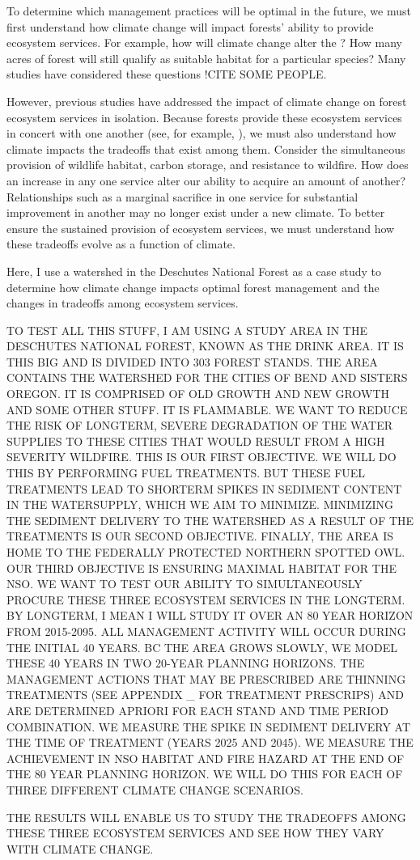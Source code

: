 To determine which management practices will be optimal in the future, we must first understand how climate change will impact forests' ability to provide ecosystem services. For example, how will climate change alter the ? How many acres of forest will still qualify as suitable habitat for a particular species? Many studies have considered these questions !CITE SOME PEOPLE.

However, previous studies have addressed the impact of climate change on forest ecosystem services in isolation. Because forests provide these ecosystem services in concert with one another (see, for example, \cite{toth2009finding}), we must also understand how climate impacts the tradeoffs that exist among them. Consider the simultaneous provision of wildlife habitat, carbon storage, and resistance to wildfire. How does an increase in any one service alter our ability to acquire an amount of another? Relationships such as a marginal sacrifice in one service for substantial improvement in another may no longer exist under a new climate. To better ensure the sustained provision of ecosystem services, we must understand how these tradeoffs evolve as a function of climate.

Here, I use a watershed in the Deschutes National Forest as a case study to determine how climate change impacts optimal forest management and the changes in tradeoffs among ecosystem services.

TO TEST ALL THIS STUFF, I AM USING A STUDY AREA IN THE DESCHUTES NATIONAL FOREST, KNOWN AS THE DRINK AREA. IT IS THIS BIG AND IS DIVIDED INTO 303 FOREST STANDS. THE AREA CONTAINS THE WATERSHED FOR THE CITIES OF BEND AND SISTERS OREGON. IT IS COMPRISED OF OLD GROWTH AND NEW GROWTH AND SOME OTHER STUFF. IT IS FLAMMABLE. WE WANT TO REDUCE THE RISK OF LONGTERM, SEVERE DEGRADATION OF THE WATER SUPPLIES TO THESE CITIES THAT WOULD RESULT FROM A HIGH SEVERITY WILDFIRE. THIS IS OUR FIRST OBJECTIVE. WE WILL DO THIS BY PERFORMING FUEL TREATMENTS. BUT THESE FUEL TREATMENTS LEAD TO SHORTERM SPIKES IN SEDIMENT CONTENT IN THE WATERSUPPLY, WHICH WE AIM TO MINIMIZE. MINIMIZING THE SEDIMENT DELIVERY TO THE WATERSHED AS A RESULT OF THE TREATMENTS IS OUR SECOND OBJECTIVE. FINALLY, THE AREA IS HOME TO THE FEDERALLY PROTECTED NORTHERN SPOTTED OWL. OUR THIRD OBJECTIVE IS ENSURING MAXIMAL HABITAT FOR THE NSO. WE WANT TO TEST OUR ABILITY TO SIMULTANEOUSLY PROCURE THESE THREE ECOSYSTEM SERVICES IN THE LONGTERM. BY LONGTERM, I MEAN I WILL STUDY IT OVER AN 80 YEAR HORIZON FROM 2015-2095. ALL MANAGEMENT ACTIVITY WILL OCCUR DURING THE INITIAL 40 YEARS. BC THE AREA GROWS SLOWLY, WE MODEL THESE 40 YEARS IN TWO 20-YEAR PLANNING HORIZONS. THE MANAGEMENT ACTIONS THAT MAY BE PRESCRIBED ARE THINNING TREATMENTS (SEE APPENDIX \_ FOR TREATMENT PRESCRIPS) AND ARE DETERMINED APRIORI FOR EACH STAND AND TIME PERIOD COMBINATION. WE MEASURE THE SPIKE IN SEDIMENT DELIVERY AT THE TIME OF TREATMENT (YEARS 2025 AND 2045). WE MEASURE THE ACHIEVEMENT IN NSO HABITAT AND FIRE HAZARD AT THE END OF THE 80 YEAR PLANNING HORIZON. WE WILL DO THIS FOR EACH OF THREE DIFFERENT CLIMATE CHANGE SCENARIOS.

THE RESULTS WILL ENABLE US TO STUDY THE TRADEOFFS AMONG THESE THREE ECOSYSTEM SERVICES AND SEE HOW THEY VARY WITH CLIMATE CHANGE.
